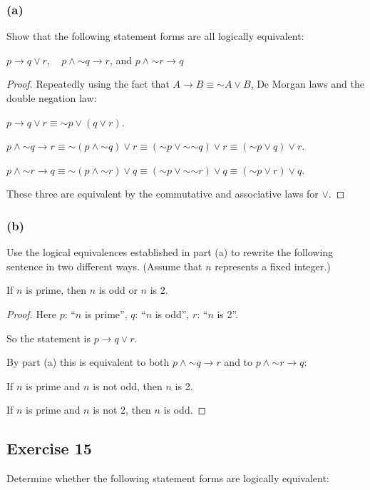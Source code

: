\documentclass[14pt]{extarticle}
\begin{document}
\subsubsection{(a)}
Show that the following statement forms are all logically equivalent:

$p \to q \vee r$, \,\,\, $p \wedge {\sim q} \to r$, and $p \wedge {\sim r} \to q$

\begin{proof}
Repeatedly using the fact that $A \to B \equiv {\sim A} \vee B$, De Morgan laws and the double negation law:

$p \to q \vee r \equiv {\sim p} \vee (q \vee r)$.

$p \wedge {\sim q} \to r \equiv {\sim (p \wedge {\sim q}) \vee r} \equiv ({\sim p} \vee {\sim {\sim q}}) \vee r \equiv ({\sim p} \vee q) \vee r$.

$p \wedge {\sim r} \to q \equiv {\sim (p \wedge {\sim r}) \vee q} \equiv ({\sim p} \vee {\sim {\sim r}}) \vee q \equiv ({\sim p} \vee r) \vee q$.

These three are equivalent by the commutative and associative laws for $\vee$.
\end{proof}

\subsubsection{(b)}
Use the logical equivalences established in part (a) to rewrite the following sentence in two different ways. (Assume that $n$
represents a fixed integer.)

\begin{center}
If $n$ is prime, then $n$ is odd or $n$ is 2.
\end{center}

\begin{proof}
Here $p$: ``$n$ is prime'', $q$: ``$n$ is odd'', $r$: ``$n$ is
2''.

So the statement is $p \to q \vee r$.

By part (a) this is equivalent to both $p \wedge {\sim q} \to r$ and to $p \wedge {\sim r} \to q$:

If $n$ is prime and $n$ is not odd, then $n$ is 2.

If $n$ is prime and $n$ is not 2, then $n$ is odd.
\end{proof}

\subsection{Exercise 15}
Determine whether the following statement forms are logically equivalent:
\end{document}
